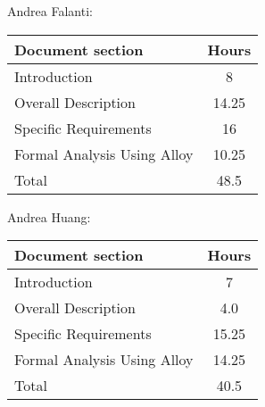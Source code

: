 Andrea Falanti:

\begin{tabular}{|l|c|}
    \hline
    Document section & Hours \\
    \hline
     Introduction & 8\\
     Overall Description & 14.25\\
     Specific Requirements & 16\\
     Formal Analysis Using Alloy & 10.25\\
     \hline
     Total & 48.5\\
     \hline
\end{tabular}
\vskip 0.3in

Andrea Huang:

\begin{tabular}{|l|c|}
    \hline
    Document section & Hours \\
    \hline
     Introduction &  7\\
     Overall Description & 4.0\\
     Specific Requirements & 15.25\\
     Formal Analysis Using Alloy & 14.25\\
     \hline
     Total & 40.5\\
     \hline
\end{tabular}